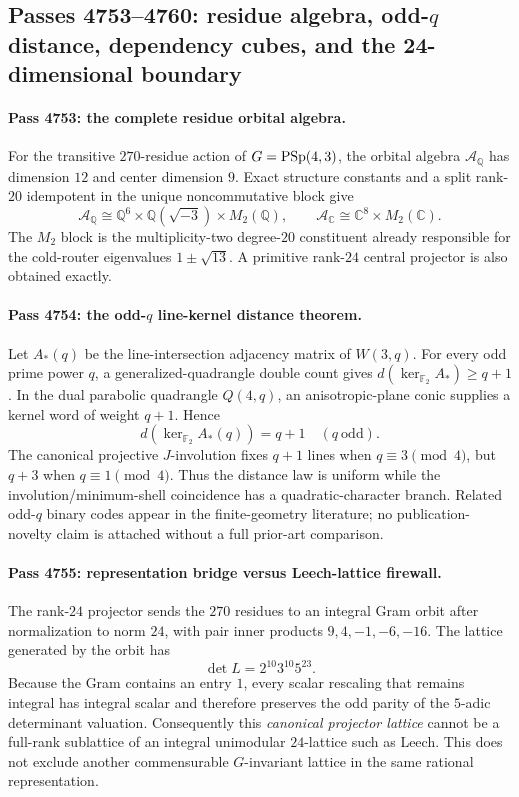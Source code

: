 \subsection*{Passes 4753--4760: residue algebra, odd-$q$ distance, dependency cubes, and the 24-dimensional boundary}

\paragraph{Pass 4753: the complete residue orbital algebra.}
For the transitive $270$-residue action of $G=\mathrm{PSp}(4,3)$, the orbital algebra
$\mathcal A_{\mathbb Q}$ has dimension $12$ and center dimension $9$.  Exact
structure constants and a split rank-$20$ idempotent in the unique
noncommutative block give
\[
 \boxed{\mathcal A_{\mathbb Q}\cong
 \mathbb Q^6\times\mathbb Q(\sqrt{-3})\times M_2(\mathbb Q)},
 \qquad
 \mathcal A_{\mathbb C}\cong\mathbb C^8\times M_2(\mathbb C).
\]
The $M_2$ block is the multiplicity-two degree-$20$ constituent already
responsible for the cold-router eigenvalues $1\pm\sqrt{13}$.  A primitive
rank-$24$ central projector is also obtained exactly.

\paragraph{Pass 4754: the odd-$q$ line-kernel distance theorem.}
Let $A_*(q)$ be the line-intersection adjacency matrix of $W(3,q)$.  For every
odd prime power $q$, a generalized-quadrangle double count gives
$d(\ker_{\mathbb F_2}A_*)\ge q+1$.  In the dual parabolic quadrangle
$Q(4,q)$, an anisotropic-plane conic supplies a kernel word of weight $q+1$.
Hence
\[
 \boxed{d(\ker_{\mathbb F_2}A_*(q))=q+1\quad(q\ \text{odd}).}
\]
The canonical projective $J$-involution fixes $q+1$ lines when
$q\equiv3\pmod4$, but $q+3$ when $q\equiv1\pmod4$.  Thus the distance law is
uniform while the involution/minimum-shell coincidence has a quadratic-character
branch.  Related odd-$q$ binary codes appear in the finite-geometry literature;
no publication-novelty claim is attached without a full prior-art comparison.

\paragraph{Pass 4755: representation bridge versus Leech-lattice firewall.}
The rank-$24$ projector sends the $270$ residues to an integral Gram orbit after
normalization to norm $24$, with pair inner products $9,4,-1,-6,-16$.  The
lattice generated by the orbit has
\[
 \boxed{\det L=2^{10}3^{10}5^{23}}.
\]
Because the Gram contains an entry $1$, every scalar rescaling that remains
integral has integral scalar and therefore preserves the odd parity of the
$5$-adic determinant valuation.  Consequently this \emph{canonical projector
lattice} cannot be a full-rank sublattice of an integral unimodular
$24$-lattice such as Leech.  This does not exclude another commensurable
$G$-invariant lattice in the same rational representation.


